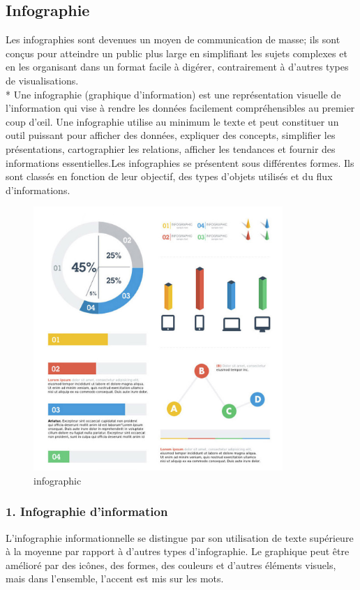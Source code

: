 \documentclass[french, a4paper, 12pt]{report}
\begin{document}
\subsection{Infographie}
Les infographies sont devenues un moyen de communication de masse; ils sont conçus pour atteindre un public plus large en simplifiant les sujets complexes et en les organisant dans un format facile à digérer, contrairement à d'autres types de visualisations. \\*
Une infographie (graphique d'information) est une représentation visuelle de l'information qui vise à rendre les données facilement compréhensibles au premier coup d'œil. Une infographie utilise au minimum le texte et peut constituer un outil puissant pour afficher des données, expliquer des concepts, simplifier les présentations, cartographier les relations, afficher les tendances et fournir des informations essentielles.Les infographies se présentent sous différentes formes. Ils sont classés en fonction de leur objectif, des types d’objets utilisés et du flux d’informations. 
\newpage
\begin{figure}[!ht]
    \centering
    \includegraphics[height=10cm]{images/infographic.jpg}
    \caption{infographic}
    \label{fig:2.1}
\end{figure}
\subsubsection{1. Infographie d'information}
L'infographie informationnelle se distingue par son utilisation de texte supérieure à la moyenne par rapport à d'autres types d'infographie. Le graphique peut être amélioré par des icônes, des formes, des couleurs et d'autres éléments visuels, mais dans l'ensemble, l'accent est mis sur les mots.
\end{document}

